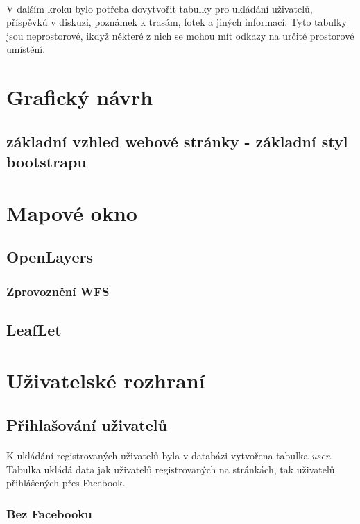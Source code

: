 \documentclass[11pt,a4paper,titlepage,oneside]{book}
\begin{document}
				\paragraph{} V dalším kroku bylo potřeba dovytvořit tabulky pro ukládání uživatelů, příspěvků v  diskuzi, poznámek k trasám, fotek a jiných informací. Tyto tabulky jsou neprostorové, ikdyž některé z nich se mohou mít odkazy na určité prostorové umístění.

		\section{Grafický návrh}
			\subsection{základní vzhled webové stránky - základní styl bootstrapu}
		\section{Mapové okno}
			\subsection{OpenLayers}
				\subsubsection{Zprovoznění WFS}
			\subsection{LeafLet}

		\section{Uživatelské rozhraní}
			\subsection{Přihlašování uživatelů}
				\paragraph{}K ukládání registrovaných uživatelů byla v databázi vytvořena tabulka \textit{user}. Tabulka ukládá data jak uživatelů registrovaných na stránkách, tak uživatelů přihlášených přes Facebook.
				\subsubsection{Bez Facebooku}
\end{document}
